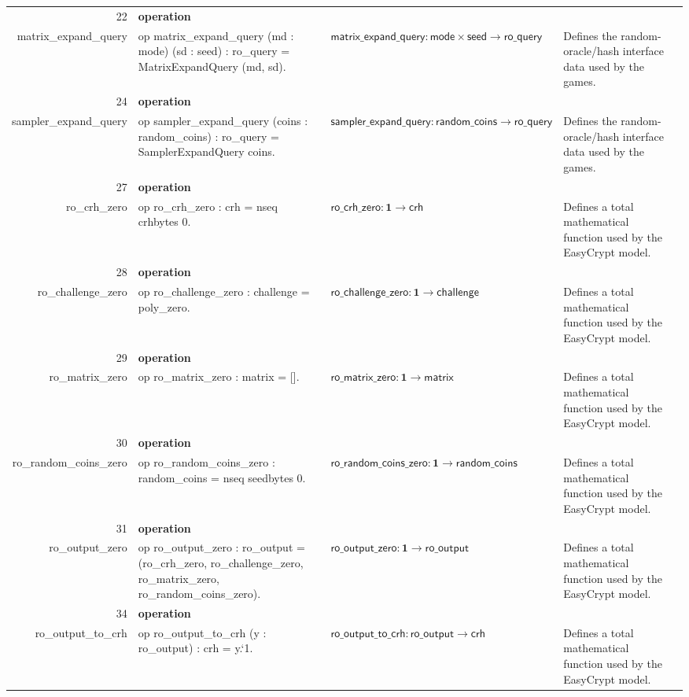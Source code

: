 \documentclass[10pt]{article}
\newcommand{\ec}[1]{\begingroup\ttfamily\scriptsize #1\endgroup}
\begin{document}
\begin{longtable}{r L{0.17\textwidth} L{0.26\textwidth} L{0.27\textwidth} L{0.20\textwidth}}
22 & \textbf{operation}\\\ec{matrix\_expand\_query} & \ec{op matrix\_expand\_query (md : mode) (sd : seed) : ro\_query = MatrixExpandQuery (md, sd).} & \(\mathsf{matrix\_expand\_query} : \mathsf{mode} \times \mathsf{seed} \to \mathsf{ro\_query}\) & Defines the random-oracle/hash interface data used by the games. \\
24 & \textbf{operation}\\\ec{sampler\_expand\_query} & \ec{op sampler\_expand\_query (coins : random\_coins) : ro\_query = SamplerExpandQuery coins.} & \(\mathsf{sampler\_expand\_query} : \mathsf{random\_coins} \to \mathsf{ro\_query}\) & Defines the random-oracle/hash interface data used by the games. \\
27 & \textbf{operation}\\\ec{ro\_crh\_zero} & \ec{op ro\_crh\_zero : crh = nseq crhbytes 0.} & \(\mathsf{ro\_crh\_zero} : \mathbf{1} \to \mathsf{crh}\) & Defines a total mathematical function used by the EasyCrypt model. \\
28 & \textbf{operation}\\\ec{ro\_challenge\_zero} & \ec{op ro\_challenge\_zero : challenge = poly\_zero.} & \(\mathsf{ro\_challenge\_zero} : \mathbf{1} \to \mathsf{challenge}\) & Defines a total mathematical function used by the EasyCrypt model. \\
29 & \textbf{operation}\\\ec{ro\_matrix\_zero} & \ec{op ro\_matrix\_zero : matrix = [].} & \(\mathsf{ro\_matrix\_zero} : \mathbf{1} \to \mathsf{matrix}\) & Defines a total mathematical function used by the EasyCrypt model. \\
30 & \textbf{operation}\\\ec{ro\_random\_coins\_zero} & \ec{op ro\_random\_coins\_zero : random\_coins = nseq seedbytes 0.} & \(\mathsf{ro\_random\_coins\_zero} : \mathbf{1} \to \mathsf{random\_coins}\) & Defines a total mathematical function used by the EasyCrypt model. \\
31 & \textbf{operation}\\\ec{ro\_output\_zero} & \ec{op ro\_output\_zero : ro\_output = (ro\_crh\_zero, ro\_challenge\_zero, ro\_matrix\_zero, ro\_random\_coins\_zero).} & \(\mathsf{ro\_output\_zero} : \mathbf{1} \to \mathsf{ro\_output}\) & Defines a total mathematical function used by the EasyCrypt model. \\
34 & \textbf{operation}\\\ec{ro\_output\_to\_crh} & \ec{op ro\_output\_to\_crh (y : ro\_output) : crh = y.`1.} & \(\mathsf{ro\_output\_to\_crh} : \mathsf{ro\_output} \to \mathsf{crh}\) & Defines a total mathematical function used by the EasyCrypt model. \\

\end{longtable}
\end{document}
